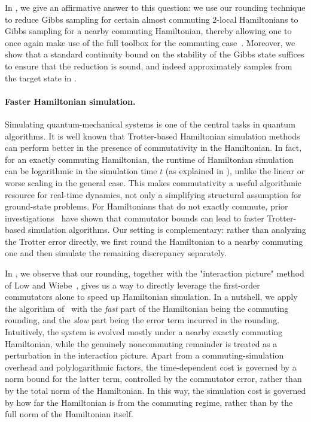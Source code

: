 \documentclass[a4paper,onecolumn,11pt]{quantumarticle}
\theoremstyle{plain}
\begin{document}
In , we give an affirmative answer to this question: we 
use our rounding technique to reduce Gibbs sampling for certain almost 
commuting $2$-local Hamiltonians to Gibbs sampling for a nearby 
commuting Hamiltonian, thereby allowing one to once again make use of 
the full toolbox for the commuting case~\cite{hwang2025gibbsstatepreparationcommuting,schmidhuber2025hamiltoniandecodedquantuminterferometry}.
Moreover, we show that a standard continuity bound on the stability of the Gibbs state suffices to ensure 
that the reduction is sound, and indeed approximately samples from the 
target state in .

\paragraph{Faster Hamiltonian simulation.}
Simulating quantum-mechanical systems is one of the central tasks in quantum algorithms.
It is well known that Trotter-based Hamiltonian simulation methods can perform better in the presence of commutativity in the Hamiltonian. In fact, for an exactly commuting Hamiltonian, the runtime of Hamiltonian simulation can be logarithmic in the simulation time $t$ (as explained in ), unlike the linear or worse scaling in the general case.
This makes commutativity a useful algorithmic resource for real-time dynamics, not only a simplifying structural assumption for ground-state problems.
For Hamiltonians that do not exactly commute, prior investigations~\cite{childs2021theory} have shown that commutator bounds can lead to faster Trotter-based simulation algorithms.  Our setting is complementary: rather than analyzing the Trotter error directly, we first round the Hamiltonian to a nearby commuting one and then simulate the remaining discrepancy separately.

In , we observe that our rounding, together with the "interaction picture" method of Low and Wiebe~\cite{low2018hamiltonian}, gives us a way to directly leverage the first-order commutators alone to speed up Hamiltonian simulation. In a nutshell, we apply the algorithm of~\cite{low2018hamiltonian} with the \emph{fast} part of the Hamiltonian being the commuting rounding, and the \emph{slow} part being the error term incurred in the rounding. 
Intuitively, the system is evolved mostly under a nearby exactly commuting Hamiltonian, while the genuinely noncommuting remainder is treated as a perturbation in the interaction picture.
Apart from a commuting-simulation overhead and polylogarithmic factors, the time-dependent cost is governed by a norm bound for the latter term, controlled by the commutator error,
rather than by the total norm of the Hamiltonian.
In this way, the simulation cost is governed by how far the Hamiltonian is from the commuting regime, rather than by the full norm of the Hamiltonian itself.
\end{document}
